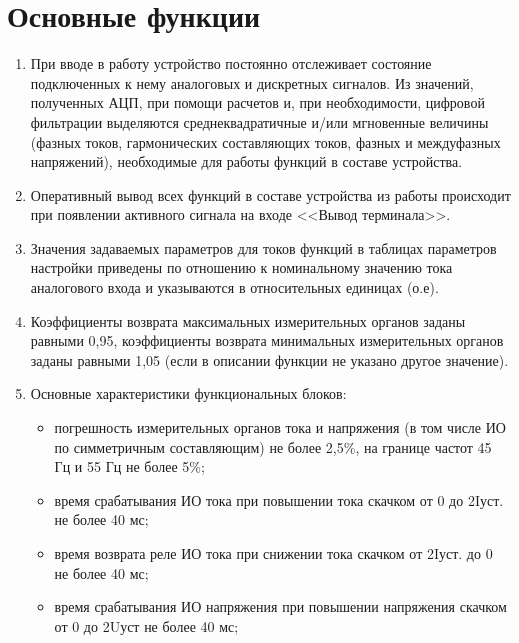 \color{uniblue}\section[Основные функции]{Основные функции}\label{sec:funcs}
\color{black}

\color{black}

\begin{enumerate}[label=\arabic{section}.\arabic{subsection}.\arabic*, labelsep=4pt, leftmargin=0pt, itemindent=57pt]
    
\item
При вводе в работу устройство постоянно отслеживает состояние подключенных к нему аналоговых и дискретных сигналов. Из значений, полученных АЦП, при помощи расчетов и, при необходимости, цифровой фильтрации выделяются среднеквадратичные и/или мгновенные величины (фазных токов, гармонических составляющих токов, фазных и междуфазных напряжений), необходимые для работы функций в составе устройства.
\item
Оперативный вывод всех функций в составе устройства из работы происходит при появлении активного сигнала на входе <<Вывод терминала>>.
\item
Значения задаваемых параметров для токов функций в таблицах параметров настройки приведены по отношению к номинальному значению тока аналогового входа и указываются в относительных единицах (о.е).
\item
Коэффициенты возврата максимальных измерительных органов заданы равными 0,95, коэффициенты возврата минимальных измерительных органов заданы равными 1,05 (если в описании функции не указано другое значение).
\item
Основные характеристики функциональных блоков:
\begin{itemize}
    \item погрешность измерительных органов тока и напряжения (в том числе ИО по симметричным составляющим) не более 2,5\%, на границе частот 45 Гц и 55 Гц не более 5\%;
    \item время срабатывания ИО тока при повышении тока скачком от 0 до 2Iуст. не более 40 мс;
    \item время возврата реле ИО тока при снижении тока скачком от 2Iуст. до 0 не более 40 мс;
    \item время срабатывания ИО напряжения при повышении напряжения скачком от 0 до 2Uуст не более 40 мс;

\end{itemize}
\end{enumerate}
